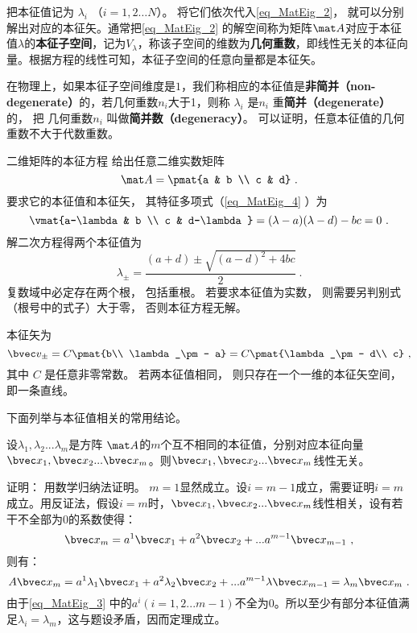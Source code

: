 把本征值记为 $\lambda_i$ （$i = 1, 2\dots N$）。 将它们依次代入\autoref{eq_MatEig_2}， 就可以分别解出对应的本征矢。通常把\autoref{eq_MatEig_2} 的解空间称为矩阵$\mat A$对应于本征值$\lambda$的\textbf{本征子空间}，记为$V_{\lambda}$，称该子空间的维数为\textbf{几何重数}，即线性无关的本征向量。根据方程的线性可知，本征子空间的任意向量都是本征矢。

在物理上，如果本征子空间维度是$1$，我们称相应的本征值是\textbf{非简并（non-degenerate）}的，若几何重数$n_i$大于1，则称 $\lambda_i$  是$n_i$ 重\textbf{简并（degenerate）}的， 把 几何重数$n_i$ 叫做\textbf{简并数（degeneracy）}。
可以证明，任意本征值的几何重数不大于代数重数。


\begin{example}{二维矩阵的本征方程}
给出任意二维实数矩阵
\begin{equation}
\mat A = \pmat{a & b \\ c & d}~.
\end{equation}
要求它的本征值和本征矢， 其特征多项式（\autoref{eq_MatEig_4} ）为
\begin{equation}
\vmat{a-\lambda & b \\ c & d-\lambda} = (\lambda-a)(\lambda-d) - bc = 0~.
\end{equation}
解二次方程得两个本征值为
\begin{equation}
\lambda_\pm = \frac{(a + d) \pm \sqrt{(a-d)^2 + 4bc}}{2}~.
\end{equation}
复数域中必定存在两个根， 包括重根。 若要求本征值为实数， 则需要另判别式（根号中的式子）大于零， 否则本征方程无解。

本征矢为
\begin{equation}
\bvec v_\pm = C\pmat{b\\ \lambda_\pm - a} = C\pmat{\lambda_\pm - d\\ c}~,
\end{equation}
其中 $C$ 是任意非零常数。 若两本征值相同， 则只存在一个一维的本征矢空间， 即一条直线。
\end{example}
下面列举与本征值相关的常用结论。
\begin{theorem}{}\label{the_MatEig_2}
设$\lambda_1,\lambda_2...\lambda_m$是方阵 $\mat A$的$m$个互不相同的本征值，分别对应本征向量$\bvec x_1,\bvec x_2...\bvec x_m$。则$\bvec x_1,\bvec x_2...\bvec x_m$线性无关。
\end{theorem}
证明： 
用数学归纳法证明。
$m=1$显然成立。设$i=m-1$成立，需要证明$i=m$成立。用反证法，假设$i=m$时，$\bvec x_1,\bvec x_2...\bvec x_m$线性相关，设有若干不全部为0的系数使得：
\begin{equation}\label{eq_MatEig_3}
\bvec x_m=a^1\bvec x_1+a^2\bvec x_2+...a^{m-1} \bvec x_{m-1}~,
\end{equation}
则有：
\begin{equation}
 A\bvec x_m=a^1\lambda_1\bvec x_1+a^2\lambda_2\bvec x_2+...a^{m-1}\lambda \bvec x_{m-1}=\lambda_m\bvec x_m~.
\end{equation}
由于\autoref{eq_MatEig_3} 中的$a^i(i=1,2...m-1)$不全为0。所以至少有部分本征值满足$\lambda_i=\lambda_m$，这与题设矛盾，因而定理成立。

